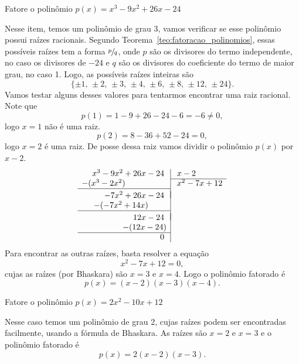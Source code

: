\begin{example}
  Fatore o polinômio
  \(
    p(x) = x^3 - 9x^2 + 26x - 24
  \)

  \solution
  Nesse item, temos um polinômio de grau 3, vamos verificar se esse polinômio
  possui raízes racionais. Segundo Teorema~\ref{teo:fatoracao_polinomios},
  essas possíveis raízes tem a forma $\sfrac{p}{q}$, onde $p$ são os
  divisores do termo independente, no caso
  os divisores de $-24$ e $q$ são os divisores do coeficiente do termo de maior
  grau, no caso 1. Logo, as possíveis raízes inteiras são
  \[
    \{ \pm 1,\, \pm 2,\, \pm 3,\, \pm 4,\, \pm 6,\, \pm 8,\, \pm 12,\, \pm 24\}.
  \]
  Vamos testar alguns desses valores
  para tentarmos encontrar uma raiz racional.
  Note que
  \[
    p(1) = 1 - 9 + 26 - 24 - 6 = -6 \neq 0,
  \]
  logo $x=1$ não é uma raiz.
  \[
    p(2) = 8 - 36 + 52 - 24 = 0,
  \]
  logo $x=2$ é uma raiz.
  De posse dessa raiz vamos dividir o polinômio $p(x)$ por $x-2$.
  \[
    \begin{array}{r|l}
        x^3 - 9x^2            + 26x - 24 \; & \; x-2         \\ \cline{2-2}
      -(x^3 - 2x^2) \hphantom{{}+ 26x - 24} & \; x^2 -7x +12 \\ \cline{1-1}
                                            & \\[\dimexpr-\normalbaselineskip+\jot]
            - 7x^2 + 26x            - 24 \; &  \\
          -(- 7x^2 + 14x) \hphantom{{}- 24} &  \\ \cline{1-1}
                                            &  \\[\dimexpr-\normalbaselineskip+\jot]
                                12x - 24 \; &  \\
                              -(12x - 24)   &  \\ \cline{1-1}
                                       0 \; &
    \end{array}
  \]
  Para encontrar as outras raízes, basta resolver a equação
  \[
    x^2 - 7x + 12 = 0,
  \]
  cujas as raízes (por Bhaskara) são $x=3$ e $x=4$.
  Logo o polinômio fatorado é
  \[
    p(x) = (x-2)(x-3)(x-4).
  \]
\end{example}

\begin{example}
  Fatore o polinômio
  \(
    p(x) = 2x^2 - 10x + 12
  \)

  \solution
  Nesse caso temos um polinômio de grau 2, cujas raízes podem ser encontradas
  facilmente, usando a fórmula de Bhaskara. As raízes são $x=2$ e $x=3$ e o
  polinômio fatorado é
  \[
    p(x) = 2(x-2)(x-3).
  \]
\end{example}


